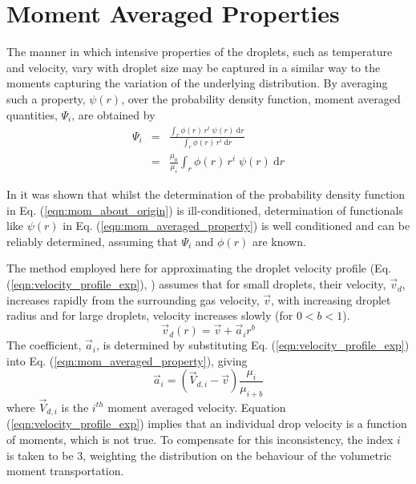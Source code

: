 \documentclass[a4paper,10pt]{article}
\begin{document}
\section{Moment Averaged Properties} \label{sec:mom_ave_prop}
The manner in which intensive properties of the droplets, such as temperature and velocity, vary with droplet size may be captured in a similar way to the moments capturing the variation of the underlying distribution.  By averaging such a property, $\psi(r)$, over the probability density function, moment averaged quantities, $\Psi_{i}$, are obtained by
\begin{eqnarray}
\Psi_{i} &=& \frac{\int_{r} \phi(r) \, r^{i} \; \psi(r) \: \mathrm{d}r}{\int_{r} \phi(r) \, r^{i} \: \mathrm{d}r} \\
&=& \frac{\mu_0}{\mu_i} \int_{r} \phi(r) \, r^{i} \; \psi(r) \: \mathrm{d}r \label{eqn:mom_averaged_property}
\end{eqnarray}

In \cite{tagliani2001} it was shown that whilst the determination of the probability density function in Eq. (\ref{eqn:mom_about_origin}) is ill-conditioned, determination of functionals like $\psi(r)$ in Eq. (\ref{eqn:mom_averaged_property}) is well conditioned and can be reliably determined, assuming that $\Psi_{i}$ and $\phi(r)$ are known.

The method employed here for approximating the droplet velocity profile (Eq. (\ref{eqn:velocity_profile_exp}), \cite{jones2011}) assumes that for small droplets, their velocity, $\vec{v}_d$, increases rapidly from the surrounding gas velocity, $\vec{v}$, with increasing droplet radius and for large droplets, velocity increases slowly (for $0<b<1$).
\begin{equation} \label{eqn:velocity_profile_exp}
\vec{v}_{d}(r) = \vec{v} + \vec{a}_i r^{b}
\end{equation}
The coefficient, $\vec{a}_i$, is determined by substituting Eq. (\ref{eqn:velocity_profile_exp}) into Eq. (\ref{eqn:mom_averaged_property}), giving
\begin{equation}
\vec{a}_i = (\vec{V}_{d,i} - \vec{v}) \frac{\mu_i}{\mu_{i+b}}
\end{equation}
where $\vec{V}_{d,i}$ is the $i^{th}$ moment averaged velocity.  Equation (\ref{eqn:velocity_profile_exp}) implies that an individual drop velocity is a function of moments, which is not true. To compensate for this inconsistency, the index $i$ is taken to be $3$, weighting the distribution on the behaviour of the volumetric moment transportation.
\end{document}
